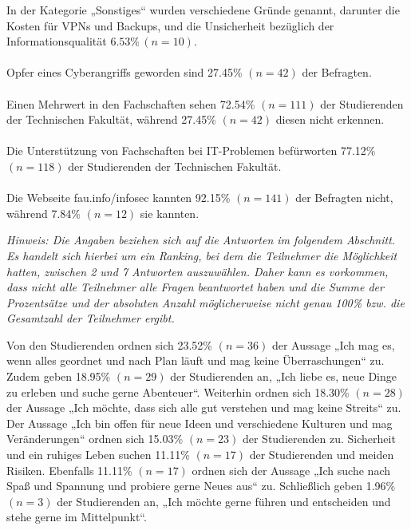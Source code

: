 \documentclass[german,report]{i1thesis}
\begin{document}
In der Kategorie „Sonstiges“ wurden verschiedene Gründe genannt, darunter die Kosten für VPNs und Backups, und die Unsicherheit bezüglich der Informationsqualität \(6.53\% \,(n = 10)\).\\
\\
Opfer eines Cyberangriffs geworden sind 27.45\% \((n = 42)\) der Befragten.\\
\\
Einen Mehrwert in den Fachschaften sehen 72.54\% \((n = 111)\) der Studierenden der Technischen Fakultät, während 27.45\% \((n = 42)\) diesen nicht erkennen.\\
\\
Die Unterstützung von Fachschaften bei IT-Problemen befürworten 77.12\% \((n = 118)\) der Studierenden der Technischen Fakultät.\\
\\
Die Webseite fau.info/infosec kannten 92.15\% \((n = 141)\) der Befragten nicht, während 7.84\% \((n = 12)\) sie kannten.

\textit{Hinweis: Die Angaben beziehen sich auf die Antworten im folgendem Abschnitt. Es handelt sich hierbei um ein Ranking, bei dem die Teilnehmer die Möglichkeit hatten, zwischen 2 und 7 Antworten auszuwählen. Daher kann es vorkommen, dass nicht alle Teilnehmer alle Fragen beantwortet haben und die Summe der Prozentsätze und der absoluten Anzahl möglicherweise nicht genau 100\% bzw. die Gesamtzahl der Teilnehmer ergibt.}

Von den Studierenden ordnen sich 23.52\% \((n = 36)\) der Aussage „Ich mag es, wenn alles geordnet und nach Plan läuft und mag keine Überraschungen“ zu. Zudem geben 18.95\% \((n = 29)\) der Studierenden an, „Ich liebe es, neue Dinge zu erleben und suche gerne Abenteuer“. Weiterhin ordnen sich 18.30\% \((n = 28)\) der Aussage „Ich möchte, dass sich alle gut verstehen und mag keine Streits“ zu. Der Aussage „Ich bin offen für neue Ideen und verschiedene Kulturen und mag Veränderungen“ ordnen sich 15.03\% \((n = 23)\) der Studierenden zu. Sicherheit und ein ruhiges Leben suchen 11.11\% \((n = 17)\) der Studierenden und meiden Risiken. Ebenfalls 11.11\% \((n = 17)\) ordnen sich der Aussage „Ich suche nach Spaß und Spannung und probiere gerne Neues aus“ zu. Schließlich geben 1.96\% \((n = 3)\) der Studierenden an, „Ich möchte gerne führen und entscheiden und stehe gerne im Mittelpunkt“.
\end{document}
